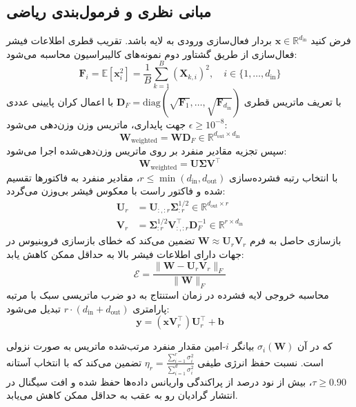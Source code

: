 \subsection{مبانی نظری و فرمول‌بندی ریاضی}
فرض کنید $\mathbf{x} \in \mathbb{R}^{d_{\text{in}}}$ بردار فعال‌سازی ورودی به لایه باشد. تقریب قطری اطلاعات فیشر فعال‌سازی از طریق گشتاور دوم نمونه‌های کالیبراسیون محاسبه می‌شود:
\begin{equation}
\mathbf{F}_i = \mathbb{E}\left[\mathbf{x}_i^2\right] = \frac{1}{B} \sum_{k=1}^B (\mathbf{X}_{k, i})^2, \quad i \in \{1, \dots, d_{\text{in}}\}
\end{equation}
با تعریف ماتریس قطری $\mathbf{D}_F = \text{diag}\left(\sqrt{\mathbf{F}_1}, \dots, \sqrt{\mathbf{F}_{d_{\text{in}}}}\right)$ با اعمال کران پایینی عددی $\epsilon \ge 10^{-8}$ جهت پایداری، ماتریس وزن وزن‌دهی می‌شود:
\begin{equation}
\mathbf{W}_{\text{weighted}} = \mathbf{W} \mathbf{D}_F \in \mathbb{R}^{d_{\text{out}} \times d_{\text{in}}}
\end{equation}
سپس تجزیه مقادیر منفرد بر روی ماتریس وزن‌دهی‌شده اجرا می‌شود:
\begin{equation}
\mathbf{W}_{\text{weighted}} = \mathbf{U} \mathbf{\Sigma} \mathbf{V}^\top
\end{equation}
با انتخاب رتبه فشرده‌سازی $r \le \min(d_{\text{in}}, d_{\text{out}})$، مقادیر منفرد به فاکتورها تقسیم شده و فاکتور راست با معکوس فیشر بی‌وزن می‌گردد:
\begin{align}
\mathbf{U}_r &= \mathbf{U}_{:, :r} \mathbf{\Sigma}_{:r}^{1/2} \in \mathbb{R}^{d_{\text{out}} \times r} \\
\mathbf{V}_r &= \mathbf{\Sigma}_{:r}^{1/2} \mathbf{V}_{:, :r}^\top \mathbf{D}_F^{-1} \in \mathbb{R}^{r \times d_{\text{in}}}
\end{align}
بازسازی حاصل به فرم $\mathbf{W} \approx \mathbf{U}_r \mathbf{V}_r$ تضمین می‌کند که خطای بازسازی فروبنیوس در جهات دارای اطلاعات فیشر بالا به حداقل ممکن کاهش یابد:
\begin{equation}
\mathcal{E} = \frac{\|\mathbf{W} - \mathbf{U}_r \mathbf{V}_r\|_F}{\|\mathbf{W}\|_F}
\end{equation}
محاسبه خروجی لایه فشرده در زمان استنتاج به دو ضرب ماتریسی سبک با مرتبه پارامتری $r \cdot (d_{\text{in}} + d_{\text{out}})$ تبدیل می‌شود:
\begin{equation}
\mathbf{y} = (\mathbf{x} \mathbf{V}_r^\top) \mathbf{U}_r^\top + \mathbf{b}
\end{equation}

که در آن $\sigma_i(\mathbf{W})$ بیانگر $i$-امین مقدار منفرد مرتب‌شده ماتریس به صورت نزولی است. نسبت حفظ انرژی طیفی $\eta_r = \frac{\sum_{i=1}^r \sigma_i^2}{\sum_{i=1}^{d} \sigma_i^2}$ تضمین می‌کند که با انتخاب آستانه $\tau \ge 0.90$، بیش از نود درصد از پراکندگی واریانس داده‌ها حفظ شده و افت سیگنال در انتشار گرادیان رو به عقب به حداقل ممکن کاهش می‌یابد.

